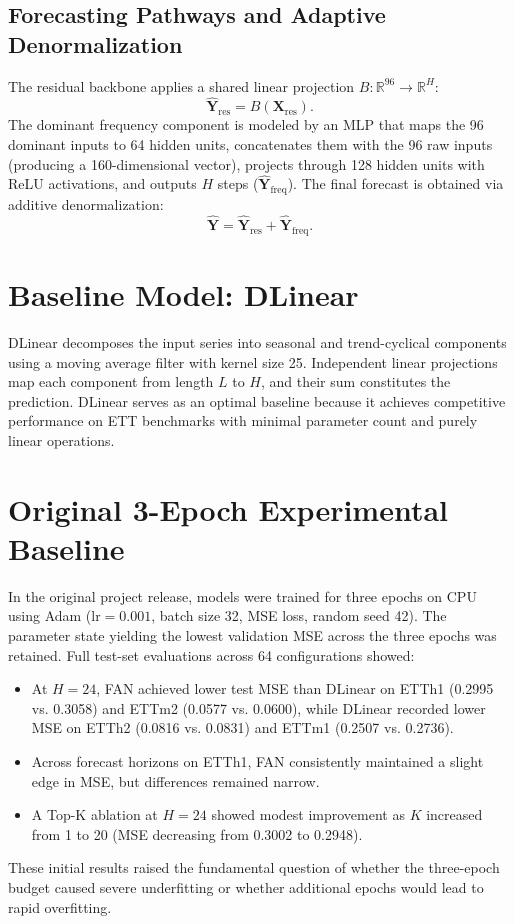 \documentclass[conference,10pt]{IEEEtran}
\begin{document}
\subsection{Forecasting Pathways and Adaptive Denormalization}
The residual backbone applies a shared linear projection $B:\mathbb{R}^{96}\rightarrow\mathbb{R}^H$:
\begin{equation}
\widehat{\mathbf{Y}}_{\mathrm{res}}=B(\mathbf{X}_{\mathrm{res}}).
\end{equation}
The dominant frequency component is modeled by an MLP that maps the 96 dominant inputs to 64 hidden units, concatenates them with the 96 raw inputs (producing a 160-dimensional vector), projects through 128 hidden units with ReLU activations, and outputs $H$ steps ($\widehat{\mathbf{Y}}_{\mathrm{freq}}$). The final forecast is obtained via additive denormalization:
\begin{equation}
\widehat{\mathbf{Y}}=\widehat{\mathbf{Y}}_{\mathrm{res}}+\widehat{\mathbf{Y}}_{\mathrm{freq}}.
\label{eq:combine}
\end{equation}

\section{Baseline Model: DLinear}
DLinear decomposes the input series into seasonal and trend-cyclical components using a moving average filter with kernel size 25. Independent linear projections map each component from length $L$ to $H$, and their sum constitutes the prediction. DLinear serves as an optimal baseline because it achieves competitive performance on ETT benchmarks with minimal parameter count and purely linear operations.

\section{Original 3-Epoch Experimental Baseline}
In the original project release, models were trained for three epochs on CPU using Adam ($\text{lr}=0.001$, batch size 32, MSE loss, random seed 42). The parameter state yielding the lowest validation MSE across the three epochs was retained. Full test-set evaluations across 64 configurations showed:
\begin{itemize}
    \item At $H=24$, FAN achieved lower test MSE than DLinear on ETTh1 (0.2995 vs. 0.3058) and ETTm2 (0.0577 vs. 0.0600), while DLinear recorded lower MSE on ETTh2 (0.0816 vs. 0.0831) and ETTm1 (0.2507 vs. 0.2736).
    \item Across forecast horizons on ETTh1, FAN consistently maintained a slight edge in MSE, but differences remained narrow.
    \item A Top-K ablation at $H=24$ showed modest improvement as $K$ increased from 1 to 20 (MSE decreasing from 0.3002 to 0.2948).
\end{itemize}
These initial results raised the fundamental question of whether the three-epoch budget caused severe underfitting or whether additional epochs would lead to rapid overfitting.
\end{document}

